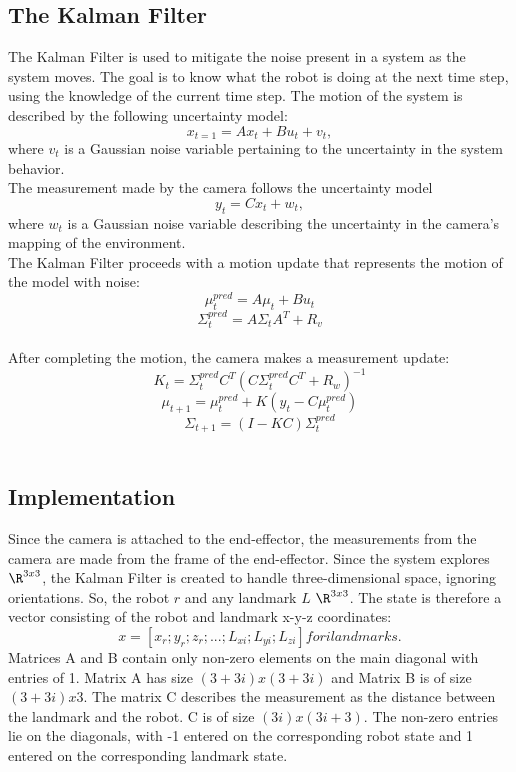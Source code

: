 \subsection*{The Kalman Filter}
The Kalman Filter is used to mitigate the noise present in a system as the system moves.  The goal is to know what the robot is doing at the next time step, using the knowledge of the current time step.  The motion of the system is described by the following uncertainty model:
\begin{equation}
    x_{t=1}=Ax_t+Bu_t+v_t,
\end{equation}
where $v_t$ is a Gaussian noise variable pertaining to the uncertainty in the system behavior.
\\
The measurement made by the camera follows the uncertainty model
\begin{equation}
    y_t=Cx_t+w_t,
\end{equation}
where $w_t$ is a Gaussian noise variable describing the uncertainty in the camera's mapping of the environment.
\\
The Kalman Filter proceeds with a motion update that represents the motion of the model with noise:
\begin{equation}
    \mu_t^{pred}=A\mu_t+Bu_t
\end{equation}
\begin{equation}
    \Sigma_t^{pred}=A\Sigma_tA^T+R_v
\end{equation}
\\
After completing the motion, the camera makes a measurement update:
\begin{equation}
    K_t=\Sigma_t^{pred}C^{T}(C\Sigma_t^{pred}C^{T}+R_w)^{-1}
\end{equation}
\begin{equation}
    \mu_{t+1}=\mu_t^{pred}+K(y_t-C\mu_t^{pred})
\end{equation}
\begin{equation}
    \Sigma_{t+1}=(I-KC)\Sigma_t^{pred}
\end{equation}
\\
\subsection*{Implementation}
Since the camera is attached to the end-effector, the measurements from the camera are made from the frame of the end-effector.  Since the system explores $\R^{3x3}$, the Kalman Filter is created to handle three-dimensional space, ignoring orientations.  So, the robot $r$ and any landmark $L$ \in $\R^{3x3}$.  The state is therefore a vector consisting of the robot and landmark x-y-z coordinates:
\begin{equation}
    x=[x_r;y_r;z_r;...;L_{xi};L_{yi};L_{zi}] for i landmarks.
\end{equation}
Matrices A and B contain only non-zero elements on the main diagonal with entries of 1.  Matrix A has size $(3+3i)x(3+3i)$ and Matrix B is of size $(3+3i)x3$.  The matrix C describes the measurement as the distance between the landmark and the robot.  C is of size $(3i)x(3i+3)$.  The non-zero entries lie on the diagonals, with -1 entered on the corresponding robot state and 1 entered on the corresponding landmark state.